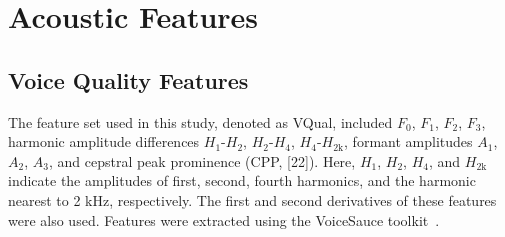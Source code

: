 \section{Acoustic Features}
\subsection{Voice Quality Features}

The feature set used in this study, denoted as VQual, included $F_0$, $F_1$, $F_2$, $F_3$, harmonic amplitude differences $H_1$-$H_2$, $H_2$-$H_4$, $H_4$-$H_\mathrm{2k}$, formant amplitudes $A_1$, $A_2$, $A_3$, and cepstral peak prominence (CPP, [22]). Here, $H_1$, $H_2$, $H_4$, and $H_\mathrm{2k}$ indicate the amplitudes of first, second, fourth harmonics, and the harmonic nearest to 2 kHz, respectively. The first and second derivatives of these features were also used. Features were extracted using the VoiceSauce toolkit~\cite{shue2010voice}.




